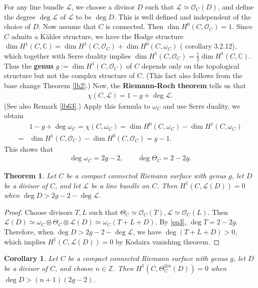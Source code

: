 \documentclass[12pt,a4paper,notitlepage]{report}
\theoremstyle{definition}
\theoremstyle{plain}
\newtheorem{thm}[df]{Theorem}
\newtheorem{co}[df]{Corollary}
\newcommand{\scr}{\mathscr}
\numberwithin{equation}{section}
\begin{document}
For any line bundle $\scr L$, we choose a divisor $D$ such that $\scr L\simeq\scr O_C(D)$, and  define the degree $\deg \scr L $\index{deg@$\deg \scr L$} of $\scr L$ to be $\deg D$. This is well defined and independent of the choice of $D$. Now assume that $C$ is connected. Then $\dim H^0(C,\scr O_C)=1$. Since $C$ admits a  K\"ahler structure, we have the Hodge structure $\dim H^1(C,\mathbb C)=\dim H^1(C,\scr O_C)+\dim H^0(C,\omega_C)$ (\cite{Huy06} corollary 3.2.12), which together with Serre duality implies $\dim H^1(C,\scr O_C)=\frac 12\dim H^1(C,\mathbb C)$. Thus the \textbf{genus} $g:=\dim H^1(C,\scr O_C)$ of $C$ depends only on the topological structure but not the complex structure of $C$. (This fact also follows from the base change Theorem \ref{lb2}.) Now, the \textbf{Riemann-Roch theorem} tells us that
\begin{align}
\chi(C,\scr L)=1-g+\deg\scr L.\label{eq162}
\end{align}
(See also Remark \ref{lb63}.) Apply this formula to $\omega_C$ and use Serre duality, we obtain
\begin{align*}
&1-g+\deg\omega_C=\chi(C,\omega_C)=\dim H^0(C,\omega_C)-\dim H^1(C,\omega_C)\\
=&\dim H^1(C,\scr O_C)-\dim H^0(C,\scr O_C)=g-1.
\end{align*}
This shows that
\begin{align}
\deg\omega_C=2g-2,\qquad \deg\Theta_C=2-2g.\label{eq3}
\end{align}
 
\begin{thm}\label{lb3}
Let $C$ be a compact connected Riemann surface with genus $g$, let $D$ be a divisor of $C$, and let $\scr L$ be a line bundle on $C$. Then   $H^1(C,\scr L(D))=0$ when $\deg D>2g-2-\deg\scr L$.
\end{thm}

\begin{proof}
	Choose  divisors $T,L$ such that $\Theta_C\simeq\scr O_C(T),\scr L\simeq\scr O_C(L)$. Then $\scr L(D)\simeq\omega_C\otimes\Theta_C\otimes\scr L(D)\simeq\omega_C(T+L+D)$. By \eqref{eq3}, $\deg T=2-2g$. Therefore, when $\deg D>2g-2-\deg\scr L$, we have $\deg(T+L+D)>0$, which implies $H^1(C,\scr L(D))=0$ by Kodaira vanishing theorem.
\end{proof}

\begin{co}\label{lb5}
Let $C$ be a compact connected Riemann surface with genus $g$, let $D$ be a divisor of $C$, and choose $n\in\mathbb Z$. Then   $H^1(C,\Theta_C^{\otimes n}(D))=0$ when $\deg D>(n+1)(2g-2)$.
\end{co}
\end{document}
